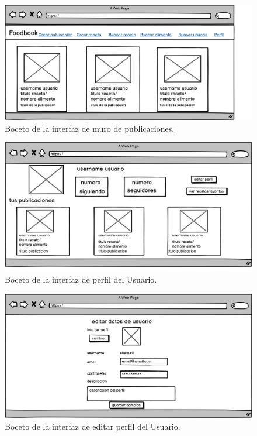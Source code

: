    
    \begin{figure}[H]
    \centering
    \includegraphics[scale=0.20]{img/muro-publicaciones.jpg}
    \caption{Boceto de la interfaz de muro de publicaciones.}
    \label{fig:muro-publicaciones}
\end{figure}
    
  
    \begin{figure}[H]
    \centering
    \includegraphics[scale=0.20]{img/perfil-usuario.jpg}
    \caption{Boceto de la interfaz de perfil del Usuario.}
    \label{fig:perfil-usuario}
\end{figure}
    
   

     \begin{figure}[H]
    \centering
    \includegraphics[scale=0.20]{img/editar-usuario.jpg}
    \caption{Boceto de la interfaz de editar perfil del Usuario.}
    \label{fig:editar-usuario}
\end{figure}
    
